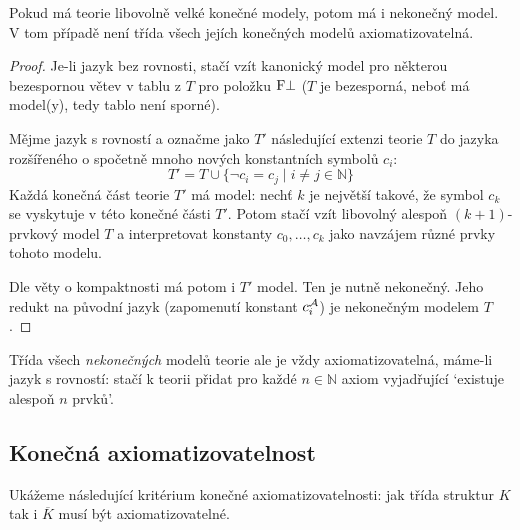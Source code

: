 \begin{theorem}
    Pokud má teorie libovolně velké konečné modely, potom má i nekonečný model. V tom případě není třída všech jejích konečných modelů axiomatizovatelná.
\end{theorem}
\begin{proof}
    Je-li jazyk bez rovnosti, stačí vzít kanonický model pro některou bezespornou větev v tablu z $T$ pro položku $\mathrm{F}\bot$ ($T$ je bezesporná, neboť má model(y), tedy tablo není sporné).     
    
    Mějme jazyk s rovností a označme jako $T'$ následující extenzi teorie $T$ do jazyka rozšířeného o spočetně mnoho nových konstantních symbolů $c_i$:
    $$
    T'=T \cup \{\neg c_i = c_j \mid i\neq j\in\mathbb N\}
    $$
    Každá konečná část teorie $T'$ má model: nechť $k$ je největší takové, že symbol $c_k$ se vyskytuje v této konečné části $T'$. Potom stačí vzít libovolný alespoň $(k+1)$-prvkový model $T$ a interpretovat konstanty $c_0,\dots,c_k$ jako navzájem různé prvky tohoto modelu.

    Dle věty o kompaktnosti má potom i $T'$ model. Ten je nutně nekonečný. Jeho redukt na původní jazyk (zapomenutí konstant $c_i^{\mathcal{A}}$) je nekonečným modelem $T$.
\end{proof}

\begin{remark}
    Třída všech \emph{nekonečných} modelů teorie ale je vždy axiomatizovatelná, máme-li jazyk s rovností: stačí k teorii přidat pro každé $n\in\mathbb N$ axiom vyjadřující `existuje alespoň $n$ prvků'.
\end{remark}


\subsection{Konečná axiomatizovatelnost}

Ukážeme následující kritérium konečné axiomatizovatelnosti: jak třída struktur $K$ tak i $\overline{K}$ musí být axiomatizovatelné.

